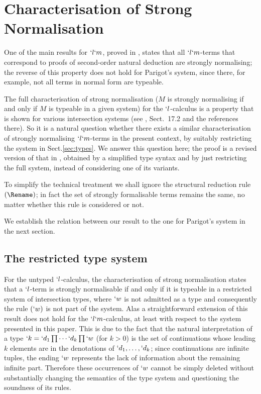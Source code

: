 \documentclass{lmcs}
\begin{document}
 \section{Characterisation of Strong Normalisation} \label{sec:character}

One of the main results for $`l`m$, proved in \cite{Parigot97}, states that all $`l`m$-terms that correspond to proofs of second-order natural deduction are strongly normalising; the reverse of this property does not hold for Parigot's system, since there, for example, not all terms in normal form are typeable.

The full characterisation of strong normalisation ($M$ is strongly normalising if and only if $M$ is typeable in a given system) for the $`l$-calculus is a property that is shown for various intersection systems (see \cite{Bar2013}, Sect.~17.2 and the references there). So it is a natural question whether there exists a similar characterisation of strongly normalising $`l`m$-terms in the present context, by suitably restricting the system in Sect.\skp\ref{sec:types}.
We answer this question here; the proof is a revised version of that in \cite{BakBdL-ITRS12}, obtained by a simplified type syntax and by just restricting the full system, instead of considering one of its variants. 

To simplify the technical treatment we shall ignore the structural reduction rule
$(\Rename)$; in fact the set of strongly formalisable terms remains the same, no matter whether this rule is considered or not.

We establish the relation between our result to the one for Parigot's system in the next section. 


 \subsection{The restricted type system} \label{sec:system}

For the untyped $`l$-calculus, the characterisation of strong normalisation states that a $`l$-term is strongly normalisable if and only if it is typeable in a restricted system of intersection types, where $`w$ is not admitted as a type and consequently the rule $(`w)$ is not part of the system.
Alas a straightforward extension of this result does not hold for the $`l`m$-calculus, at least with respect to the system presented in this paper. 
This is due to the fact that the natural interpretation of a type $`k = `d_1\prod \cdots`d_k\prod `w $ (for $k>0$) is the set of continuations whose leading $k$ elements are in the denotations of $`d_1,\ldots,`d_k$; since continuations are infinite tuples, the ending $`w$ represents the lack of information about the remaining infinite part. 
Therefore these occurrences of $`w$ cannot be simply deleted without substantially changing the semantics of the type system and questioning the soundness of its rules.
\end{document}
